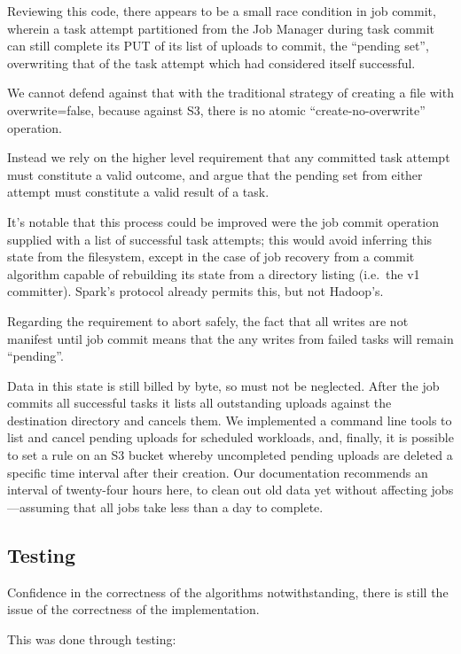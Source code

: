 \documentclass[format=acmsmall, screen=true, nonacm, timestamp, review=false]{acmart}
\begin{document}
Reviewing this code, there appears to be a small race condition in job commit,
wherein a task attempt partitioned from the Job Manager during task commit
can still complete its PUT of its list of uploads to commit, the ``pending set'',
overwriting that of the task attempt which had considered itself successful.

We cannot defend against that with the traditional strategy of creating
a file with overwrite=false, because against S3, there is no atomic
``create-no-overwrite'' operation.

Instead we rely on the higher level requirement that any committed task attempt must
constitute a valid outcome, and argue that the pending set from either attempt
must constitute a valid result of a task.


It's notable that this process could be improved were the job commit
operation supplied with a list of successful task attempts;
this would avoid inferring this state from the filesystem, except in
the case of job recovery from a commit algorithm capable of
rebuilding its state from a directory listing (i.e.\ the v1 committer).
Spark's protocol already permits this, but not Hadoop's.

Regarding the requirement to abort safely, the fact that all writes are
not manifest until job commit means that the any writes from failed tasks
will remain ``pending''.

Data in this state is still billed by byte, so must not be neglected.
After the job commits all successful tasks it lists all outstanding
uploads against the destination directory and cancels them.
We implemented a command line tools to list and cancel pending uploads for
scheduled workloads, and, finally,
it is possible to set a rule on an S3 bucket whereby uncompleted
pending uploads are deleted a specific time interval after their creation.
Our documentation recommends an interval of twenty-four hours here, to
clean out old data yet without affecting jobs ---assuming that all jobs
take less than a day to complete.


\subsection{Testing}
\label{subsec:testing}

Confidence in the correctness of the algorithms notwithstanding, there
is still the issue of the correctness of the implementation.


This was done through testing:
\end{document}
